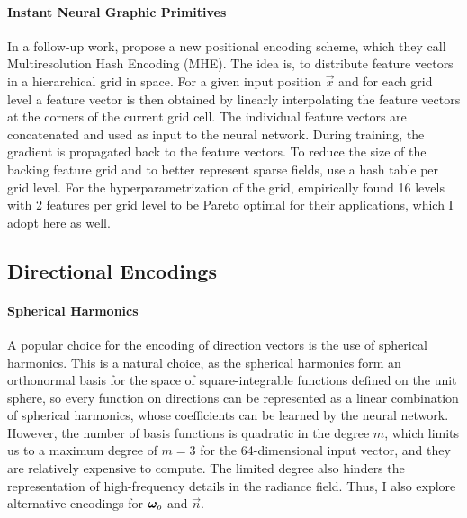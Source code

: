 \paragraph{Instant Neural Graphic Primitives}
In a follow-up work, \textcite{muller2022} propose a new positional encoding scheme, which they call Multiresolution Hash Encoding (MHE).
The idea is, to distribute feature vectors in a hierarchical grid in space.
For a given input position $\vec{x}$ and for each grid level a feature vector is then obtained by linearly interpolating the feature vectors at the corners of the current grid cell.
The individual feature vectors are concatenated and used as input to the neural network.
During training, the gradient is propagated back to the feature vectors.
To reduce the size of the backing feature grid and to better represent sparse fields, \textcite{muller2022} use a hash table per grid level.
For the hyperparametrization of the grid, \textcite{muller2022} empirically found 16 levels with 2 features per grid level to be Pareto optimal for their applications, which I adopt here as well.

\subsection{Directional Encodings}

\paragraph{Spherical Harmonics}
A popular choice for the encoding of direction vectors is the use of spherical harmonics.
This is a natural choice, as the spherical harmonics form an orthonormal basis for the space of square-integrable functions defined on the unit sphere, so every function on directions can be represented as a linear combination of spherical harmonics, whose coefficients can be learned by the neural network.
However, the number of basis functions is quadratic in the degree $m$, which limits us to a maximum degree of $m=3$ for the 64-dimensional input vector, and they are relatively expensive to compute.
The limited degree also hinders the representation of high-frequency details in the radiance field.
Thus, I also explore alternative encodings for ${\bm{\omega}_o}$ and $\vec{n}$.

